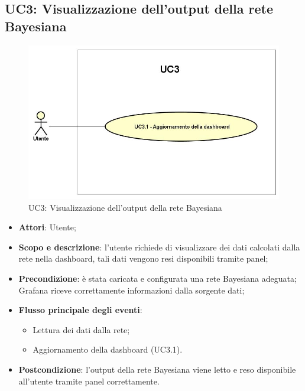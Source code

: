 \subsection{UC3: Visualizzazione dell'output della rete Bayesiana}
\hypertarget{UC3}{}
\begin{figure} [H]
	\centering
	\includegraphics[scale=0.45]{Img/UC3}
	\caption{UC3: Visualizzazione dell'output della rete Bayesiana}\label{}
\end{figure}
\begin{itemize}
	\item \textbf{Attori}: Utente;
	\item \textbf{Scopo e descrizione}: l'utente richiede di visualizzare dei dati calcolati dalla rete nella dashboard, tali dati vengono resi disponibili tramite panel;
	\item \textbf{Precondizione}: è stata caricata e configurata una rete Bayesiana adeguata; Grafana riceve correttamente informazioni dalla sorgente dati;
	\item \textbf{Flusso principale degli eventi}:
	\begin{itemize}
		\item Lettura dei dati dalla rete;
		\item Aggiornamento della dashboard (UC3.1).
	\end{itemize}
	\item \textbf{Postcondizione}: l'output della rete Bayesiana viene letto e reso disponibile all'utente tramite panel correttamente.
\end{itemize}
